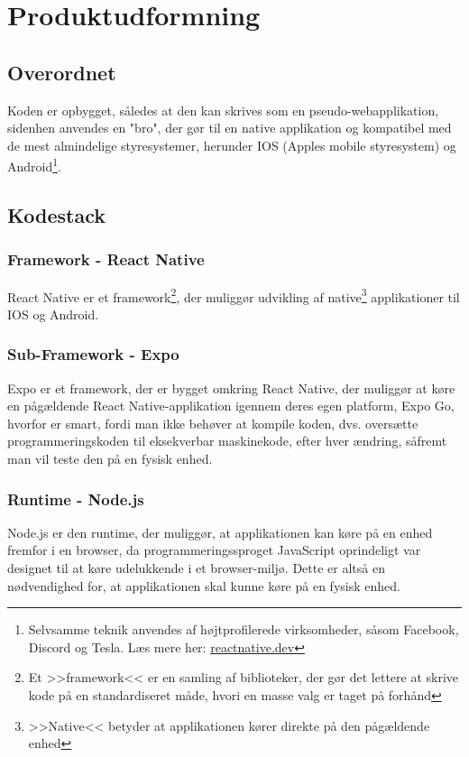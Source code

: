 \section{Produktudformning}
\subsection{Overordnet}
Koden er opbygget, således at den kan skrives som en pseudo-webapplikation, sidenhen anvendes en "bro", der gør til en native applikation og kompatibel med de mest almindelige styresystemer, herunder IOS (Apples mobile styresystem) og Android\footnote{Selvsamme teknik anvendes af højtprofilerede virksomheder, såsom Facebook, Discord og Tesla. Læs mere her: \href{https://reactnative.dev/}{reactnative.dev}}.

\subsection{Kodestack}
\subsubsection{Framework - React Native \label{sec:reactnative}}
React Native er et framework\footnote{Et >>framework<< er en samling af biblioteker, der gør det lettere at skrive kode på en standardiseret måde, hvori en masse valg er taget på forhånd}, der muliggør udvikling af native\footnote{>>Native<< betyder at applikationen kører direkte på den pågældende enhed} applikationer til IOS og Android. 
\subsubsection{Sub-Framework - Expo}
Expo er et framework, der er bygget omkring React Native, der muliggør at køre en pågældende React Native-applikation igennem deres egen platform, Expo Go, hvorfor er smart, fordi man ikke behøver at kompile koden, dvs. oversætte programmeringskoden til eksekverbar maskinekode, efter hver ændring, såfremt man vil teste den på en fysisk enhed. 
\subsubsection{Runtime - Node.js}
Node.js er den runtime, der muliggør, at applikationen kan køre på en enhed fremfor i en browser, da programmeringssproget JavaScript oprindeligt var designet til at køre udelukkende i et browser-miljø. Dette er altså en nødvendighed for, at applikationen skal kunne køre på en fysisk enhed.
